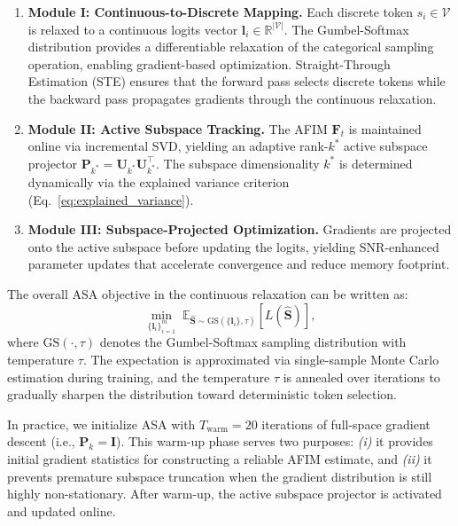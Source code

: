 \documentclass[preprint,12pt]{elsarticle}
\begin{document}
\begin{enumerate}[leftmargin=*]
    \item \textbf{Module I: Continuous-to-Discrete Mapping.} Each discrete token $s_i \in \mathcal{V}$ is relaxed to a continuous logits vector $\mathbf{l}_i \in \mathbb{R}^{|\mathcal{V}|}$. The Gumbel-Softmax distribution provides a differentiable relaxation of the categorical sampling operation, enabling gradient-based optimization. Straight-Through Estimation (STE) ensures that the forward pass selects discrete tokens while the backward pass propagates gradients through the continuous relaxation.
    
    \item \textbf{Module II: Active Subspace Tracking.} The AFIM $\mathbf{F}_t$ is maintained online via incremental SVD, yielding an adaptive rank-$k^*$ active subspace projector $\mathbf{P}_{k^*} = \mathbf{U}_{k^*} \mathbf{U}_{k^*}^\top$. The subspace dimensionality $k^*$ is determined dynamically via the explained variance criterion (Eq.~\eqref{eq:explained_variance}).
    
    \item \textbf{Module III: Subspace-Projected Optimization.} Gradients are projected onto the active subspace before updating the logits, yielding SNR-enhanced parameter updates that accelerate convergence and reduce memory footprint.
\end{enumerate}

The overall ASA objective in the continuous relaxation can be written as:
\begin{equation}
\label{eq:asa_objective}
\min_{\{\mathbf{l}_i\}_{i=1}^m} \; \mathbb{E}_{\hat{\mathbf{S}} \sim \text{GS}(\{\mathbf{l}_i\}, \tau)} \left[ L(\hat{\mathbf{S}}) \right],
\end{equation}
where $\text{GS}(\cdot, \tau)$ denotes the Gumbel-Softmax sampling distribution with temperature $\tau$. The expectation is approximated via single-sample Monte Carlo estimation during training, and the temperature $\tau$ is annealed over iterations to gradually sharpen the distribution toward deterministic token selection.

\begin{remark}
\label{rem:warmup}
In practice, we initialize ASA with $T_{\text{warm}} = 20$ iterations of full-space gradient descent (i.e., $\mathbf{P}_k = \mathbf{I}$). This warm-up phase serves two purposes: \textit{(i)} it provides initial gradient statistics for constructing a reliable AFIM estimate, and \textit{(ii)} it prevents premature subspace truncation when the gradient distribution is still highly non-stationary. After warm-up, the active subspace projector is activated and updated online.
\end{remark}
\end{document}
